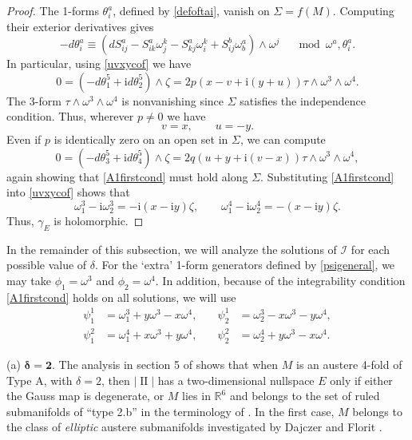 \documentclass[12pt,reqno]{amsart}
\theoremstyle{definition}
\theoremstyle{remark}
\begin{document}
\begin{proof}
The 1-forms $\theta^a_i$, defined by \eqref{defoftai}, vanish on $\Sigma=f(M)$.
Computing their exterior derivatives gives
$$-d\theta^a_i \equiv (dS^a_{ij}-S^a_{ik} {\omega}^k_j -S^a_{kj}{\omega}^k_i +S^b_{ij}{\omega}^a_b){\wedge} {\omega}^j
\quad\mod {\omega}^a, \theta^a_i.$$
In particular, using \eqref{uvxycof} we have
$$0=(-d\theta^5_1+{\mathrm i} d\theta^5_2) {\wedge} \zeta = 2p(x-v+{\mathrm i}(y+u))\tau {\wedge} {\omega}^3 {\wedge} {\omega}^4.$$
The 3-form $\tau {\wedge} {\omega}^3 {\wedge} {\omega}^4$ is nonvanishing since $\Sigma$ satisfies the
independence condition.  Thus, wherever $p\ne0$ we have
\begin{equation}\label{A1firstcond}
v=x, \qquad u = -y.
\end{equation}
Even if $p$ is identically zero on an open set in $\Sigma$, we can compute
$$0=(-d\theta^5_3 + {\mathrm i} d\theta^5_4){\wedge} \zeta =2q(u+y+{\mathrm i} (v-x))\tau {\wedge} {\omega}^3 {\wedge} {\omega}^4,$$
again showing that \eqref{A1firstcond} must hold along $\Sigma$.  Substituting
\eqref{A1firstcond} into \eqref{uvxycof} shows that
$${\omega}^3_1 -{\mathrm i} {\omega}^3_2 = -{\mathrm i}(x-{\mathrm i} y)\zeta, \qquad {\omega}^4_1 -{\mathrm i} {\omega}^4_2 =-(x-{\mathrm i} y)\zeta.$$
Thus, $\gamma_E$ is holomorphic.
\end{proof}

In the remainder of this subsection, we will analyze the solutions of ${{\mathcal I}}$
for each possible value of $\delta$.
For the `extra' 1-form generators defined
by \eqref{psigeneral}, we may take $\phi_1={\omega}^3$ and $\phi_2={\omega}^4$.  In addition,
because of the integrability condition \eqref{A1firstcond} holds on all solutions,
we will use
\begin{equation}\label{A1extra}
\begin{aligned}
\psi^1_1 &= {\omega}^3_1 +y {\omega}^3 - x {\omega}^4, \quad & \psi^1_2 &= {\omega}^3_2 - x{\omega}^3 - y{\omega}^4,\\
\psi^2_1 &= {\omega}^4_1 + x{\omega}^3 + y{\omega}^4, \quad & \psi^2_2 &={\omega}^4_2 +y {\omega}^3 - x {\omega}^4.
\end{aligned}
\end{equation}

\medskip
(a) $\boldsymbol{\delta=2}$.
The analysis in section 5 of \cite{ayeaye} shows that when $M$ is
an austere 4-fold of Type A, with $\delta=2$, then $|{\operatorname{II}}|$ has a two-dimensional
nullspace $E$ only if either the Gauss map is degenerate, or $M$ lies in ${\mathbb R}^6$ and belongs
to the set of ruled submanifolds of ``type 2.b'' in the terminology of \cite{ayeaye}.
In the first case, $M$ belongs to the class of {\em elliptic} austere submanifolds investigated
by Dajczer and Florit \cite{DF}.
\end{document}
